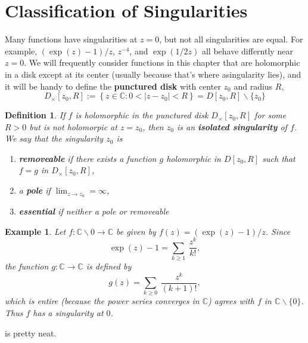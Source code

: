 \documentclass{article}
\theoremstyle{accentcolorthm}
\newtheorem{cdef}{Definition}[section]
\theoremstyle{accentcolorthm}
\newtheorem{cexamp}{Example}[section]
\begin{document}
\section{Classification of Singularities}

Many functions have singularities at $z=0$, but not all singularities are equal.
For example, $(\exp(z)-1)/z$, $z^{-4}$, and $\exp({1/2z})$ all behave differntly
near $z=0$.
We will frequently consider functions in this chapter that are holomorphic in a
disk except at its center (usually because that’s where asingularity lies), and
it will be handy to define the \textbf{punctured disk} with center $z_0$ and radius $R$,
\[ D_\times [z_0, R] := \left\{ z \in \mathbb{C}  : 0 < |z-z_0| < R\right\}  = D[z_0,R] \backslash \{z_0\} \]


\begin{cdef} 
	If $f$ is holomorphic in the punctured disk $D_\times[z_0, R]$ for some $R>0$
	but is not holomorpic at $z=z_0$, then $z_0$ is an
	\textbf{isolated singularity} of $f$. We say that the singularity $z_0$ is
	\begin{enumerate}[label=(\alph*)]
		\item \textbf{removeable} if there exists a function $g$ holomorphic in $D[z_0,R]$
			such that $f=g$ in $D_\times[z_0, R]$, 
		\item a \textbf{pole} if $\displaystyle\lim_{z\to z_0} = \infty$, 
		\item \textbf{essential} if neither a pole or removeable
\end{enumerate}
\end{cdef}

\begin{cexamp}\label{ex:powers}
	Let $f: \mathbb{C} \backslash {0} \to \mathbb{C}$ be given by $f(z) = (\exp(z)-1)/z$.
	Since 
	\[ \exp(z)-1 = \sum_{k\geq 1}\  \frac{z^k}{k!}, \]
	the function $g:\mathbb{C} \to \mathbb{C}$ is defined by
	\[ g(z) = \sum_{k\geq 0}\  \frac{z^k}{(k+1)!}, \]
	which is entire (because the power series converges in $\mathbb{C}$) agrees with $f$ in
	$\mathbb{C}\backslash \{0\}$. Thus $f$ has a singularity at $0$.

\end{cexamp}

 is pretty neat.
\end{document}
